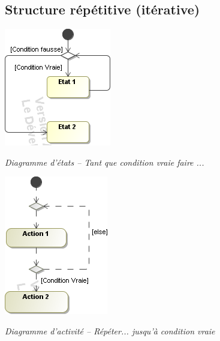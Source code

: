\documentclass[10pt,fleqn]{article} %
\begin{document}
\subsection{Structure répétitive (itérative)}
\begin{minipage}[c]{.48\linewidth}
\begin{center}
\includegraphics[width=.8\textwidth]{images/Iteratif_stm}

\textit{Diagramme d'états -- Tant que condition vraie faire ...}
\end{center}
\end{minipage} \hfill
\begin{minipage}[c]{.48\linewidth}
\begin{center}
\includegraphics[width=.6\textwidth]{images/Iteratif_act}

\textit{Diagramme d'activité -- Répéter... jusqu'à condition vraie}
\end{center}
\end{minipage}
\end{document}
